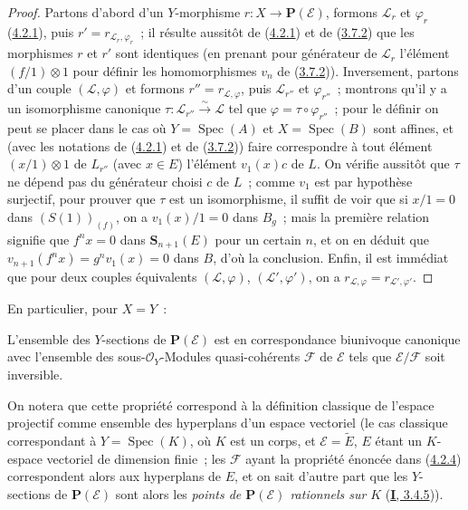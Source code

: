 \begin{proof}
Partons d'abord d'un $Y$-morphisme $r:X\to\mathbf{P}(\mathcal{E})$, formons
$\mathcal{L}_r$ et $\varphi_r$ (\hyperref[II.4.2.1-fr]{4.2.1}), puis
$r'=r_{\mathcal{L}_r,\varphi_r}$~; il résulte aussitôt de
(\hyperref[II.4.2.1-fr]{4.2.1}) et de
(\hyperref[II.3.7.2-fr]{3.7.2}) que les morphismes $r$ et $r'$ sont
identiques (en prenant pour générateur de $\mathcal{L}_r$ l'élément
$(f/1)\otimes1$ pour définir les homomorphismes $v_n$ de
(\hyperref[II.3.7.2-fr]{3.7.2})). Inversement, partons d'un couple
$(\mathcal{L},\varphi)$ et formons
$r''=r_{\mathcal{L},\varphi}$, puis $\mathcal{L}_{r''}$ et
$\varphi_{r''}$~; montrons qu'il y a un isomorphisme canonique
$\tau:\mathcal{L}_{r''}\xrightarrow{\sim}\mathcal{L}$ tel que
$\varphi=\tau\circ\varphi_{r''}$~; pour le définir on peut se placer dans le
cas où $Y=\operatorname{Spec}(A)$ et $X=\operatorname{Spec}(B)$ sont affines,
et (avec les notations de (\hyperref[II.4.2.1-fr]{4.2.1}) et de
(\hyperref[II.3.7.2-fr]{3.7.2})) faire correspondre à tout élément
$(x/1)\otimes1$ de $L_{r''}$ (avec $x\in E$) l'élément $v_1(x)c$ de $L$. On
vérifie aussitôt que $\tau$ ne dépend pas du générateur choisi $c$ de $L$~;
comme $v_1$ est par hypothèse surjectif, pour prouver que $\tau$ est un
isomorphisme, il suffit de voir que si $x/1=0$ dans $(S(1))_{(f)}$, on a
$v_1(x)/1=0$ dans $B_g$~; mais la première relation signifie que $f^nx=0$
dans $\mathbf{S}_{n+1}(E)$ pour un certain $n$, et on en déduit que
$v_{n+1}(f^nx)=g^nv_1(x)=0$ dans $B$, d'où la conclusion. Enfin, il est
immédiat que pour deux couples équivalents $(\mathcal{L},\varphi)$,
$(\mathcal{L}',\varphi')$, on a
$r_{\mathcal{L},\varphi}=r_{\mathcal{L}',\varphi'}$.
\end{proof}

En particulier, pour $X=Y$~:

\begin{theorem}[4.2.4]
\label{II.4.2.4-fr}
L'ensemble des $Y$-sections de $\mathbf{P}(\mathcal{E})$ est en
correspondance biunivoque canonique avec l'ensemble des
sous-$\mathcal{O}_Y$-Modules quasi-cohérents $\mathcal{F}$ de $\mathcal{E}$
tels que $\mathcal{E}/\mathcal{F}$ soit inversible.
\end{theorem}

On notera que cette propriété correspond à la définition classique de
l'\og espace projectif\fg{} comme ensemble des hyperplans d'un espace
vectoriel (le cas classique correspondant à $Y=\operatorname{Spec}(K)$, où
$K$ est un corps, et $\mathcal{E}=\widetilde{E}$, $E$ étant un $K$-espace
vectoriel de dimension finie~; les $\mathcal{F}$ ayant la propriété énoncée
dans (\hyperref[II.4.2.4-fr]{4.2.4}) correspondent alors aux hyperplans de
$E$, et on sait d'autre part que les $Y$-sections de
$\mathbf{P}(\mathcal{E})$ sont alors les \emph{points de
$\mathbf{P}(\mathcal{E})$ rationnels sur} $K$
(\hyperref[I.3.4.5-fr]{\textbf{I}, 3.4.5})).


